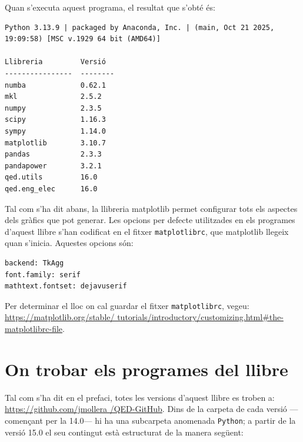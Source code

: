 Quan s'executa aquest programa, el resultat que s'obté és:
\lstset{
	language=,
	numbers=none,
	frame=none
}

\begin{lstlisting}
Python 3.13.9 | packaged by Anaconda, Inc. | (main, Oct 21 2025, 19:09:58) [MSC v.1929 64 bit (AMD64)]

Llibreria         Versió
----------------  --------
numba             0.62.1
mkl               2.5.2
numpy             2.3.5
scipy             1.16.3
sympy             1.14.0
matplotlib        3.10.7
pandas            2.3.3
pandapower        3.2.1
qed.utils         16.0
qed.eng_elec      16.0
\end{lstlisting} 


Tal com s'ha dit abans, la llibreria matplotlib permet configurar tots els aspectes dels gràfics que pot generar. Les opcions per defecte utilitzades en els programes d'aquest llibre s'han codificat en el fitxer \texttt{matplotlibrc}, que matplotlib llegeix quan s'inicia. Aquestes opcions són:
\begin{lstlisting}
backend: TkAgg
font.family: serif
mathtext.fontset: dejavuserif
\end{lstlisting} 

Per determinar el lloc on cal guardar el fitxer \texttt{matplotlibrc}, vegeu: \href{https://matplotlib.org/stable/tutorials/introductory/customizing.html#the-matplotlibrc-file}{https:/\!\!/matplotlib.org/stable/ tutorials/introductory/customizing.html\#the-matplotlibrc-file}.



\section{On trobar els programes del llibre}\label{sec:progs-llibre-internet}

Tal com s'ha dit en el prefaci, totes les versions d'aquest llibre es troben a:
\href{https://github.com/jmollera/QED-GitHub}{https:/\!\!/github.com/jmollera
/QED-GitHub}.  Dins de la carpeta de cada versió ---començant per la 14.0--- hi ha una subcarpeta anomenada \texttt{Python}; a partir de la versió 15.0  el seu contingut està estructurat de la manera següent: 
 
